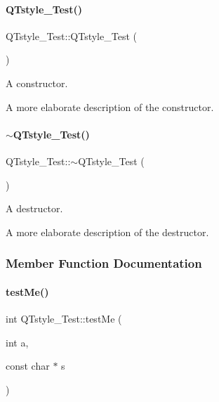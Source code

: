 \paragraph{\texorpdfstring{Q\+Tstyle\+\_\+\+Test()}{QTstyle\_Test()}}
{\footnotesize\ttfamily Q\+Tstyle\+\_\+\+Test\+::\+Q\+Tstyle\+\_\+\+Test (\begin{DoxyParamCaption}{ }\end{DoxyParamCaption})}



A constructor. 

A more elaborate description of the constructor. \mbox{\label{class_q_tstyle___test_a7e82397d534d9a867f0857da01a46e9e}} 
\paragraph{\texorpdfstring{$\sim$\+Q\+Tstyle\+\_\+\+Test()}{~QTstyle\_Test()}}
{\footnotesize\ttfamily Q\+Tstyle\+\_\+\+Test\+::$\sim$\+Q\+Tstyle\+\_\+\+Test (\begin{DoxyParamCaption}{ }\end{DoxyParamCaption})}



A destructor. 

A more elaborate description of the destructor. 

\subsubsection{Member Function Documentation}
\mbox{\label{class_q_tstyle___test_a8840748753118dd468e8368a28e49c62}} 
\paragraph{\texorpdfstring{test\+Me()}{testMe()}}
{\footnotesize\ttfamily int Q\+Tstyle\+\_\+\+Test\+::test\+Me (\begin{DoxyParamCaption}\item[{int}]{a,  }\item[{const char $\ast$}]{s }\end{DoxyParamCaption})}



